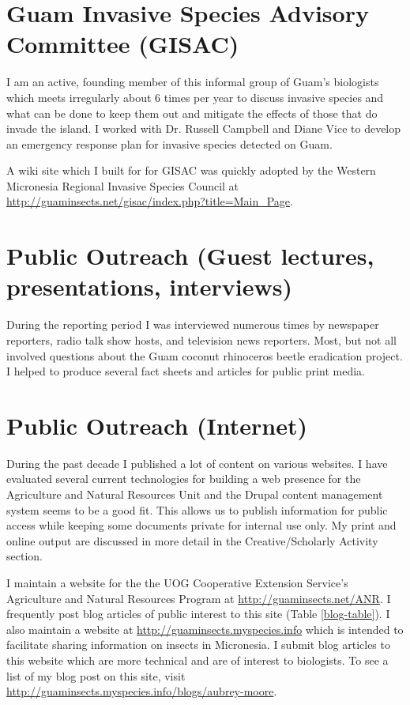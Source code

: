 \documentclass[12pt,oneside,english]{scrbook}
\begin{document}
\section{Guam Invasive Species Advisory Committee (GISAC)}

I am an active, founding member of this informal group of Guam's biologists
which meets irregularly about 6 times per year to discuss invasive
species and what can be done to keep them out and mitigate the effects
of those that do invade the island. I worked with Dr. Russell Campbell
and Diane Vice to develop an emergency response plan for invasive
species detected on Guam.

A wiki site which I built for for GISAC was quickly adopted by the
Western Micronesia Regional Invasive Species Council at \url{http://guaminsects.net/gisac/index.php?title=Main_Page}.

\section{Public Outreach (Guest lectures, presentations, interviews)}

During the reporting period I was interviewed numerous times by newspaper
reporters, radio talk show hosts, and television news reporters. Most, but not all involved questions about
the Guam coconut rhinoceros beetle eradication project. I helped to produce
several fact sheets and articles for public print media. 

\section{Public Outreach (Internet)}

During the past decade I published a lot
of content on various websites. I have evaluated several current technologies
for building a web presence for the Agriculture and Natural Resources
Unit and the Drupal content management system seems to be a good fit.
This allows us to publish information for public access while keeping
some documents private for internal use only. My print and online
output are discussed in more detail in the Creative/Scholarly Activity
section. 

I maintain a website for the the UOG Cooperative Extension Service's
Agriculture and Natural Resources Program at \url{http://guaminsects.net/ANR}.
I frequently post blog articles of public interest to this site (Table
\ref{blog-table}). I also maintain a website at \url{http://guaminsects.myspecies.info}
which is intended to facilitate sharing information on insects in
Micronesia. I submit blog articles to this website which
are more technical and are of interest to biologists. To see a list of my blog post on this site, visit \url{http://guaminsects.myspecies.info/blogs/aubrey-moore}. 
\end{document}
